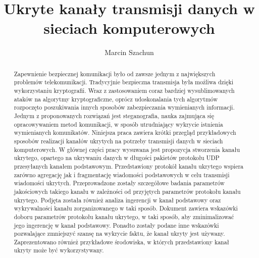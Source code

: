 \documentclass[a4paper, twoside, 12pt]{report}
\begin{document}
\title{Ukryte kanały transmisji danych w sieciach komputerowych}
\author{Marcin Szachun}
\maketitle


\begin{abstract}
    Zapewnienie bezpiecznej komunikacji było od zawsze jednym z największych
    problemów telekomunikacji. Tradycyjnie bezpieczna transmisja była możliwa
    dzięki wykorzystaniu kryptografii. Wraz z zastosowaniem coraz bardziej wysublimowanych
    ataków na algorytmy kryptograficzne, oprócz udoskonalania tych algorytmów rozpoczęto
    poszukiwania innych sposobów zabezpieczania wymienianych informacji. Jednym
    z proponowanych rozwiązań jest steganografia, nauka zajmująca się opracowywaniem
    metod komunikacji, w sposób utrudniający wykrycie istnienia wymienianych komunikatów.
    Niniejsza praca zawiera krótki przegląd przykładowych sposobów
    realizacji kanałów ukrytych na potrzeby transmisji danych w sieciach komputerowych.
    W głównej części pracy wysuwana jest propozycja stworzenia kanału ukrytego, opartego na ukrywaniu
    danych w długości pakietów protokołu UDP przesyłanych kanałem podstawowym.
    Przedstawiony protokół kanału ukrytego wspiera zarówno agregację jak i fragmentację
    wiadomości podstawowych w celu transmisji wiadomości ukrytych. Przeprowadzone
    zostały szczegółowe badania parametrów jakościowych takiego kanału w zależności
    od przyjętych parametrów protokołu kanału ukrytego. Podjęta została również
    analiza ingerencji w kanał podstawowy oraz wykrywalności kanału zorganizowanego w taki sposób.
    Dokument zawiera wskazówki doboru parametrów protokołu kanału ukrytego, w taki sposób, aby
    zminimalizować jego ingerencję w kanał podstawowy. Ponadto zostały podane inne
    wskazówki pozwalające zmniejszyć szansę na wykrycie faktu, że kanał ukryty jest
    używany. Zaprezentowano również przykładowe środowiska, w których przedstawiony
    kanał ukryty może być wykorzystywany.
\end{abstract}

\tableofcontents

\listoffigures
\end{document}
